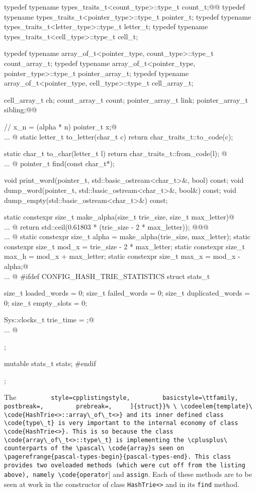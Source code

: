 \documentclass[a4paper,11pt]{article}
\makeatletter
\renewcommand{\=}{\protect\nobreakdash-\hspace{0pt}}
\renewcommand{\~}{\protect\nobreakdash--\hspace{0pt}}
\newcommand{\plusplus}{\textbf{\raisebox{1pt}{++}}}
\newcommand{\cplusplus}{$C\plusplus$}
\newcommand{\pascal}{\code{Pascal}}
\newcommand{\code}[1]{{\tt{#1}}}
\newcommand\code*[1]{\mbox{\code{#1}}}
\let\lst@ifskiplines\iffalse
\newcommand\skipnumbering[1]{%
	\setcounter{lstnumber}{\numexpr#1-1\relax}%
	\let\lst@ifskiplines\iftrue
	\\\lst@PlaceNumber
	\let\lst@ifskiplines\iffalse
	\lst@ifshowskiplines...\fi
}
\let\lst@PlaceNumber\@empty
\newcommand{\cppinline}[1]{%
	{\lstinline[
		style=cpplistingstyle,
		basicstyle=\ttfamily,
		postbreak=,
		prebreak=,
	]{#1}}%
}
\newcommand{\codeelem}[1]{#1}
\newcommand{\struct}{\code{struct}}%
\newcommand{\structtempl}{\struct\ \codeelem{template}}%
\renewcommand{\codeelem}[1]{\emph{##1}}%
\renewcommand{\struct}{\cppinline{struct}}%
\newcommand{\pagerefrange}[2]{%
	\vpagerefrange{#1}{#2}}
\newcommand{\pagerefrange}[2]{}
\makeatother
\begin{document}
\begin{hashtrielisting}[2006]
{	typedef typename types_traits_t<count_type>::type_t   count_t;@\label{cpp-types-first-line}@
	typedef typename types_traits_t<pointer_type>::type_t pointer_t;
	typedef typename types_traits_t<letter_type>::type_t  letter_t;
	typedef typename types_traits_t<cell_type>::type_t    cell_t;

	typedef
		typename array_of_t<pointer_type, count_type>::type_t
		count_array_t;
	typedef
		typename array_of_t<pointer_type, pointer_type>::type_t
		pointer_array_t;
	typedef
		typename array_of_t<pointer_type, cell_type>::type_t
		cell_array_t;

	cell_array_t    ch;
	count_array_t   count;
	pointer_array_t link;
	pointer_array_t sibling;@\label{cpp-types-last-line}@

	// x_n = (alpha * n) %
	pointer_t x;@\skipnumbering{2240}@
	static letter_t to_letter(char_t c)
	{ return char_traits_t::to_code(c); }

	static char_t to_char(letter_t l)
	{ return char_traits_t::from_code(l); }  @\skipnumbering{2249}@
	pointer_t find(const char_t*);

	void print_word(pointer_t, std::basic_ostream<char_t>&, bool) const;
	void dump_word(pointer_t, std::basic_ostream<char_t>&, bool&) const;
	void dump_empty(std::basic_ostream<char_t>&) const;

	static constexpr size_t make_alpha(size_t trie_size, size_t max_letter)@\skipnumbering{2259}@
	{ return std::ceil(0.61803 * (trie_size - 2 * max_letter)); }@\label{cpp-make-alpha-expr}@@\skipnumbering{2266}@
	static constexpr size_t alpha = make_alpha(trie_size, max_letter);
	static constexpr size_t mod_x = trie_size - 2 * max_letter;
	static constexpr size_t max_h = mod_x + max_letter;
	static constexpr size_t max_x = mod_x - alpha;@\skipnumbering{2281}@
#ifdef CONFIG_HASH_TRIE_STATISTICS
	struct stats_t
	{
		size_t loaded_words = 0;
		size_t failed_words = 0;
		size_t duplicated_words = 0;
		size_t empty_slots = 0;

		Sys::clocks_t trie_time = {};@\skipnumbering{2292}@
	};

	mutable stats_t stats;
#endif
};
\end{hashtrielisting}
%
The \structtempl\ \code{HashTrie<>::array\_of\_t<>} and its inner defined class
\code{type\_t} is very important to the internal economy of class \code{HashTrie<>}.
This is so because the class \code{array\_of\_t<>::type\_t} is implementing
the \cplusplus\ counterparts of the \pascal\ \code{array}s seen on  
\pagerefrange{pascal-types-begin}{pascal-types-end}. This class provides two
oveloaded methods (which were cut off from the listing above), namely
\code{operator[]} and \code{assign}. Each of these methods are to be seen
at work in the constructor of class \code{HashTrie<>} and in its \code{find}
method.
\end{document}
